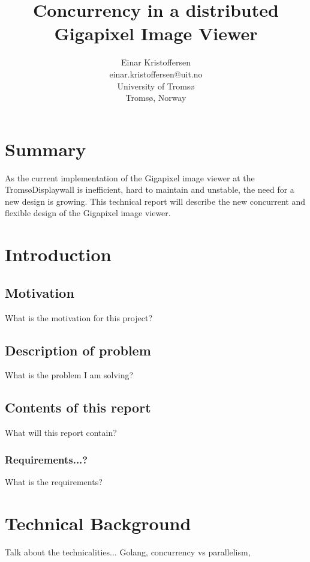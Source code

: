 \documentclass[12pt, a4paper, oneside]{article}
\begin{document}
\title{\bfseries {Concurrency in a distributed \\Gigapixel Image Viewer}}
\author{Einar Kristoffersen \\
einar.kristoffersen@uit.no\\
University of Troms\o\\
Troms\o, Norway}
\date{}

\maketitle





%
\newpage
\tableofcontents
\newpage


\section{Summary}
As the current implementation of the Gigapixel image viewer at the Troms\o Displaywall is inefficient, hard to maintain and unstable, the need for a new design is growing. This technical report will describe the new concurrent and flexible design of the Gigapixel image viewer.

\section{Introduction}
\subsection{Motivation}
What is the motivation for this project?
\subsection{Description of problem}
What is the problem I am solving?
\subsection{Contents of this report}
What will this report contain?
\subsubsection{Requirements...?}
What is the requirements?
\section{Technical Background}
Talk about the technicalities... Golang, concurrency vs parallelism,
\end{document}

